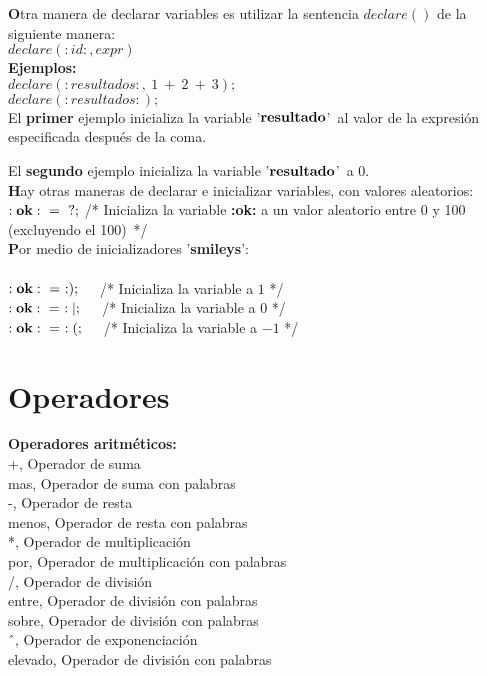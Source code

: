 \documentclass[11pt]{article}
\begin{document}
{\bf O}tra manera de declarar variables es utilizar la sentencia $declare()$ de la siguiente manera:\\
{\bf $declare(:id:, expr)$}\\

{\bf Ejemplos:}\\

{\bf $declare(:resultados:,\ 1\ +\ 2\ +\ 3);$}\\
{\bf $declare(:resultados:);$}\\

El {\bf primer} ejemplo inicializa la variable '${\bf resultado}$'\ al valor de la expresión especificada después de la coma.

El {\bf segundo} ejemplo inicializa la variable '${\bf resultado}$'\ a $0$.\\

{\bf H}ay otras maneras de declarar e inicializar variables, con valores aleatorios:\\
${\bf :ok:}\ =\ {\bf ?};$  /* Inicializa la variable {\bf :ok:} a un valor aleatorio entre 0 y 100 (excluyendo el 100)\ */\\
{\large {\bf P}or medio de inicializadores '{\bf smileys}':}\\\\
${\bf :ok:}\ =\ :);$\ \ \ /* Inicializa la variable a $1$ */\\
${\bf :ok:}\ =\ :|;$\ \ \ /* Inicializa la variable a $0$ */\\
${\bf :ok:}\ =\ :(;$\ \ \ /* Inicializa la variable a $-1$ */

\section{Operadores}

\large{\bf Operadores aritm\'eticos:}\\

\large{+}, Operador de suma\\
\large{mas}, Operador de suma con palabras\\
\large{-}, Operador de resta\\
\large{menos}, Operador de resta con palabras\\
\large{*}, Operador de multiplicaci\'on\\
\large{por}, Operador de multiplicaci\'on con palabras\\
\large{/}, Operador de divisi\'on\\
\large{entre}, Operador de divisi\'on con palabras\\
\large{sobre}, Operador de divisi\'on con palabras\\
\large{\^\ }, Operador de exponenciaci\'on\\
\large{elevado}, Operador de divisi\'on con palabras\\
\end{document}
